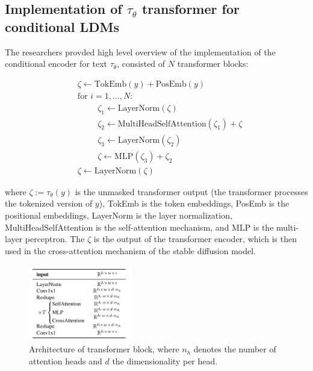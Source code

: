 \subsection{Implementation of $\tau_\theta$ transformer for conditional LDMs}

The researchers provded high level overview of the implementation of the conditional encoder for text $\tau_\theta$, consisted of $N$ transformer blocks:

\begin{align*}
    &\zeta \leftarrow \text{TokEmb}(y) + \text{PosEmb}(y) \\
    &\text{for } i = 1, \ldots, N : \\
        &\hspace{1cm} \zeta_1 \leftarrow \text{LayerNorm}(\zeta) \\
        &\hspace{1cm} \zeta_2 \leftarrow \text{MultiHeadSelfAttention}(\zeta_1) + \zeta \\
        &\hspace{1cm} \zeta_3 \leftarrow \text{LayerNorm}(\zeta_2) \\
        &\hspace{1cm} \zeta \leftarrow \text{MLP}(\zeta_3) + \zeta_2 \\
    &\zeta \leftarrow \text{LayerNorm}(\zeta)
\end{align*}

where $\zeta := \tau_\theta(y)$ is the unmasked transformer output (the transformer processes the tokenized version of $y$), TokEmb is the token embeddings, PosEmb is the positional embeddings, LayerNorm is the layer normalization, MultiHeadSelfAttention is the self-attention mechanism, and MLP is the multi-layer perceptron. The $\zeta$ is the output of the transformer encoder, which is then used in the cross-attention mechanism of the stable diffusion model.

\begin{figure}[h]
    \centering
    \includegraphics[width=0.4\textwidth]{images/diffusion_models/stable_diffusion/transformer_block.png}
    \caption{Architecture of transformer block, where $n_h$ denotes the number of attention heads and $d$ the dimensionality per head.}
\end{figure}







